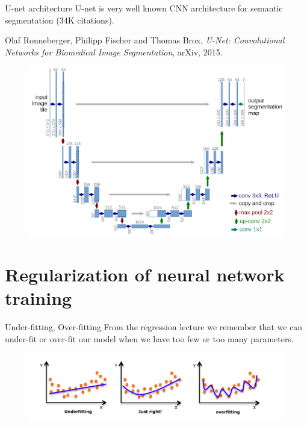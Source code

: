 \documentclass[handout]{beamer}
\begin{document}
\begin{frame}{U-net architecture}
    \alert{U-net} is very well known CNN architecture for semantic segmentation (34K citations).

\begin{thebibliography}{GBC16}

Olaf Ronneberger, Philipp Fischer and Thomas Brox, \emph{{U-Net: Convolutional Networks for Biomedical Image Segmentation}}, arXiv, 2015.
\end{thebibliography}

    \begin{figure}
        \centering
        \includegraphics[width=.6\textwidth]{fig/L2/unet.png}
    \end{figure}
\end{frame}

\section{Regularization of neural network training}

\begin{frame}{Under-fitting, Over-fitting}
    From the regression lecture we remember that we can \alert{under-fit} or \alert{over-fit} our model when we have too few or too many parameters.

    \begin{figure}
        \centering
        \includegraphics[width=.9\textwidth]{fig/L2/underfitting_overfitting.png}
    \end{figure}
\end{frame}
\end{document}
